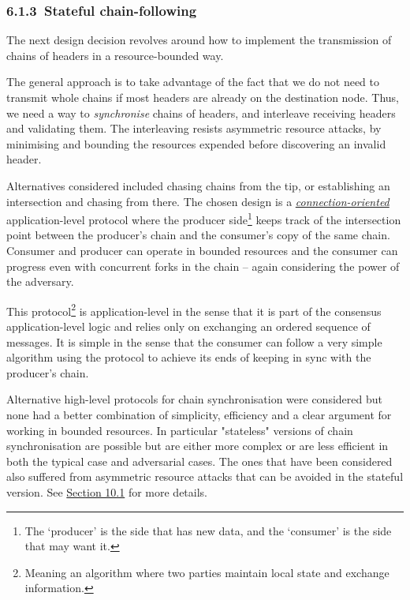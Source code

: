 \documentclass[]{article}
\begin{document}
\hypertarget{stateful-chain-following}{%
\subsubsection{​6.1.3​~Stateful
chain-following}\label{stateful-chain-following}}

The next design decision revolves around how to implement the
transmission of chains of headers in a resource-bounded way.

The general approach is to take advantage of the fact that we do not
need to transmit whole chains if most headers are already on the
destination node. Thus, we need a way to \emph{synchronise} chains of
headers, and interleave receiving headers and validating them. The
interleaving resists asymmetric resource attacks, by minimising and
bounding the resources expended before discovering an invalid header.

Alternatives considered included chasing chains from the tip, or
establishing an intersection and chasing from there. The chosen design
is a
\emph{\href{https://en.wikipedia.org/wiki/Connection-oriented_communication}{{connection-oriented}}}
application-level protocol where the producer side\footnote{The
  `producer' is the side that has new data, and the `consumer' is the
  side that may want it.} keeps track of the intersection point between
the producer's chain and the consumer's copy of the same chain. Consumer
and producer can operate in bounded resources and the consumer can
progress even with concurrent forks in the chain -- again considering
the power of the adversary.

This protocol\footnote{Meaning an algorithm where two parties maintain
  local state and exchange information.} is application-level in the
sense that it is part of the consensus application-level logic and
relies only on exchanging an ordered sequence of messages. It is simple
in the sense that the consumer can follow a very simple algorithm using
the protocol to achieve its ends of keeping in sync with the producer's
chain.

Alternative high-level protocols for chain synchronisation were
considered but none had a better combination of simplicity, efficiency
and a clear argument for working in bounded resources. In particular
"stateless" versions of chain synchronisation are possible but are
either more complex or are less efficient in both the typical case and
adversarial cases. The ones that have been considered also suffered from
asymmetric resource attacks that can be avoided in the stateful version.
See \protect\hyperlink{stateful-implementation}{{Section 10.1}} for more
details.
\end{document}
